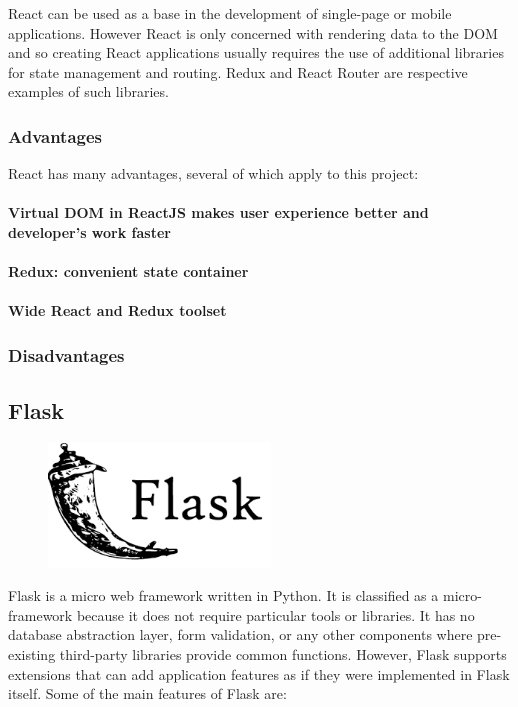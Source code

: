 React can be used as a base in the development of single-page or mobile applications. However React is only concerned with rendering data to the DOM and so creating React applications usually requires the use of additional libraries for state management and routing. Redux and React Router are respective examples of such libraries. 

\subsubsection{Advantages}
React has many advantages, several of which apply to this project:

\paragraph{Virtual DOM in ReactJS makes user experience better and developer’s work faster}

\paragraph{Redux: convenient state container}

\paragraph{Wide React and Redux toolset}

\subsubsection{Disadvantages}


\subsection{Flask}
\par
\medskip
\begin{center}
    \includegraphics[width=8cm,height=3.3cm,keepaspectratio]{images/flask}
\end{center}
Flask is a micro web framework written in Python. It is classified as a micro-framework because it does not require particular tools or libraries. It has no database abstraction layer, form validation, or any other components where pre-existing third-party libraries provide common functions. However, Flask supports extensions that can add application features as if they were implemented in Flask itself. Some of the main features of Flask are:

